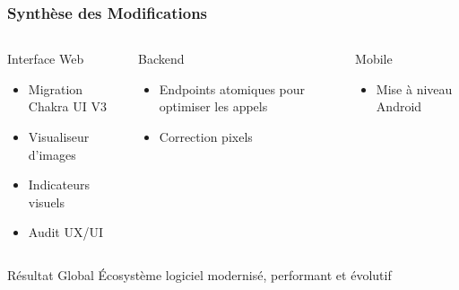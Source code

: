 \documentclass[
	11pt,
	aspectratio=169,
]{beamer}
\begin{document}
\begin{frame}
	\frametitle{Synthèse des Modifications}
	
	\begin{columns}[t]
		\begin{column}{0.32\textwidth}
			\begin{block}{Interface Web}
				\small
				\begin{itemize}
					\item Migration Chakra UI V3
					\item Visualiseur d'images
					\item Indicateurs visuels
					\item Audit UX/UI
				\end{itemize}
			\end{block}
		\end{column}
		
		\begin{column}{0.32\textwidth}
			\begin{block}{Backend}
				\small
				\begin{itemize}
					\item Endpoints atomiques pour optimiser les appels
					\item Correction pixels
				\end{itemize}
			\end{block}
		\end{column}
		
		\begin{column}{0.32\textwidth}
			\begin{block}{Mobile}
				\small
				\begin{itemize}
					\item Mise à niveau Android
				\end{itemize}
			\end{block}
		\end{column}
	\end{columns}
	
	\bigskip\bigskip
	
	\begin{exampleblock}{Résultat Global}
		\centering
		Écosystème logiciel modernisé, performant et évolutif
	\end{exampleblock}
\end{frame}
\end{document}
